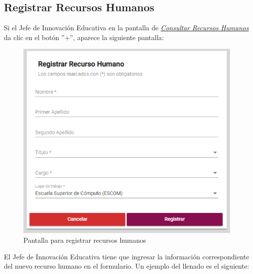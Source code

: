


    \newpage
        \hypertarget{registrarRH}{}
        \subsection{Registrar Recursos Humanos}
            Si el Jefe de Innovación Educativa  en la pantalla de \hyperlink{consultarRH}{\textit{Consultar Recursos Humanos}} da clic en el botón ''+'', aparece la siguiente pantalla:

            \begin{figure}[H]
                \centering
                \hypertarget{registrarUs}{\includegraphics[width=0.7\linewidth]{images/SP1/RegistrarRH}}
                \caption{Pantalla para registrar recursos humanos}
                \label{registrarrh}
            \end{figure}

            El Jefe de Innovación Educativa tiene que ingresar la información correspondiente del nuevo recurso humano en el formulario. Un ejemplo del llenado es el siguiente:

